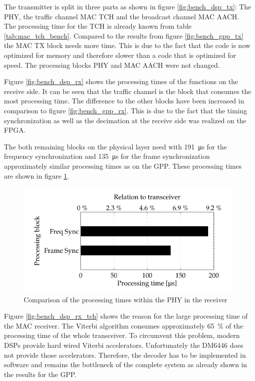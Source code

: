The transmitter is split in three parts as shown in figure \ref{fig:bench_dsp_tx}: The PHY, the traffic channel MAC TCH and the broadcast channel MAC AACH. The processing time for the TCH is already known from table \ref{tab:mac_tch_bench}. Compared to the results from figure \ref{fig:bench_gpp_tx} the MAC TX block needs more time. This is due to the fact that the code is now optimized for memory and therefore slower than a code that is optimized for speed. The processing blocks PHY and MAC AACH were not changed.

Figure \ref{fig:bench_dsp_rx} shows the processing times of the functions on the receive side. It can be seen that the traffic channel is the block that consumes the most processing time. The difference to the other blocks have been increased in comparison to figure \ref{fig:bench_gpp_rx}. This is due to the fact that the timing synchronization as well as the decimation at the receive side was realized on the FPGA. 

The both remaining blocks on the physical layer need with \SI{191}{\micro s} for the frequency synchronization and \SI{135}{\micro s} for the frame synchronization approximately similar processing times as on the GPP. These processing times are shown in figure \ref{fig:bench_dsp_rx_phy}. 

\begin{figure}[h!!]
	\centering
		\includegraphics{../kapitel05/figures/bench_dsp_rx_phy.pdf}
	\caption{Comparison of the processing times within the PHY in the receiver}
	\label{fig:bench_dsp_rx_phy}
\end{figure}

Figure \ref{fig:bench_dsp_rx_tch} shows the reason for the large processing time of the MAC receiver. The Viterbi algorithm consumes approximately \SI{65}{\%} of the processing time of the whole transceiver. To circumvent this problem, modern DSPs provide hard wired Viterbi accelerators. Unfortunately the DM6446 does not provide those accelerators. Therefore, the decoder has to be implemented in software and remains the bottleneck of the complete system as already shown in the results for the GPP.  


